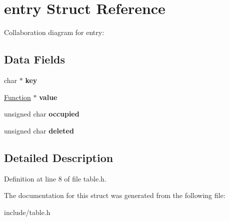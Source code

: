 \hypertarget{structentry}{}\section{entry Struct Reference}
\label{structentry}


Collaboration diagram for entry\+:
\subsection*{Data Fields}
\begin{DoxyCompactItemize}
\item 
\mbox{\label{structentry_a90fad543c99ac664b9ed3cfe1a6d3a13}} 
char $\ast$ {\bfseries key}
\item 
\mbox{\label{structentry_ad2c113b889edb718afcd6266d2e785cd}} 
\hyperlink{structfunction}{Function} $\ast$ {\bfseries value}
\item 
\mbox{\label{structentry_a969a0568d9d995d487db7ee8e9782a47}} 
unsigned char {\bfseries occupied}
\item 
\mbox{\label{structentry_a80b561593b800a3ace93b0493a82af01}} 
unsigned char {\bfseries deleted}
\end{DoxyCompactItemize}


\subsection{Detailed Description}


Definition at line 8 of file table.\+h.



The documentation for this struct was generated from the following file\+:\begin{DoxyCompactItemize}
\item 
include/table.\+h\end{DoxyCompactItemize}

